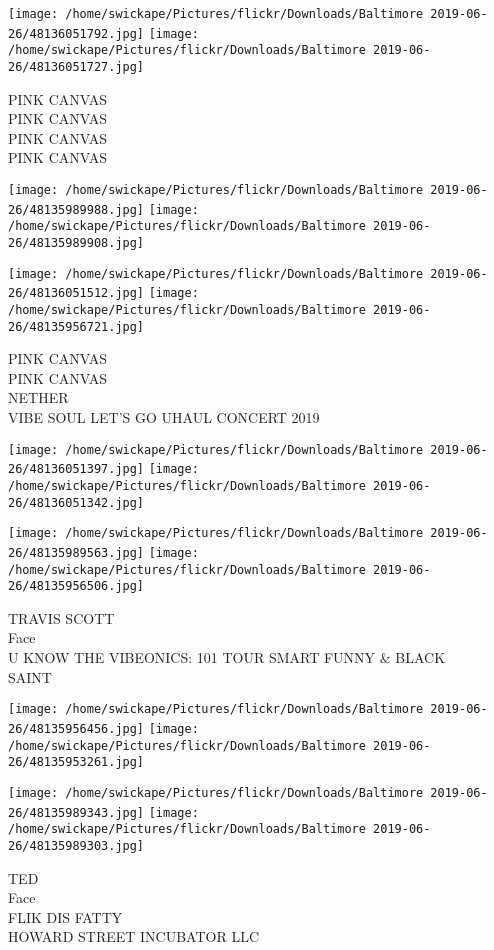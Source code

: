 \documentclass[10pt,letterpaper]{article}
\begin{document}
\texttt{[image: /home/swickape/Pictures/flickr/Downloads/Baltimore 2019-06-26/48136051792.jpg]}
\texttt{[image: /home/swickape/Pictures/flickr/Downloads/Baltimore 2019-06-26/48136051727.jpg]}

PINK CANVAS\\
PINK CANVAS\\
PINK CANVAS\\
PINK CANVAS
\pagebreak

\texttt{[image: /home/swickape/Pictures/flickr/Downloads/Baltimore 2019-06-26/48135989988.jpg]}
\texttt{[image: /home/swickape/Pictures/flickr/Downloads/Baltimore 2019-06-26/48135989908.jpg]}

\texttt{[image: /home/swickape/Pictures/flickr/Downloads/Baltimore 2019-06-26/48136051512.jpg]}
\texttt{[image: /home/swickape/Pictures/flickr/Downloads/Baltimore 2019-06-26/48135956721.jpg]}

PINK CANVAS\\
PINK CANVAS\\
NETHER\\
VIBE SOUL LET'S GO UHAUL CONCERT 2019
\pagebreak

\texttt{[image: /home/swickape/Pictures/flickr/Downloads/Baltimore 2019-06-26/48136051397.jpg]}
\texttt{[image: /home/swickape/Pictures/flickr/Downloads/Baltimore 2019-06-26/48136051342.jpg]}

\texttt{[image: /home/swickape/Pictures/flickr/Downloads/Baltimore 2019-06-26/48135989563.jpg]}
\texttt{[image: /home/swickape/Pictures/flickr/Downloads/Baltimore 2019-06-26/48135956506.jpg]}

TRAVIS SCOTT\\
Face\\
U KNOW THE VIBEONICS: 101 TOUR SMART FUNNY \& BLACK\\
SAINT
\pagebreak

\texttt{[image: /home/swickape/Pictures/flickr/Downloads/Baltimore 2019-06-26/48135956456.jpg]}
\texttt{[image: /home/swickape/Pictures/flickr/Downloads/Baltimore 2019-06-26/48135953261.jpg]}

\texttt{[image: /home/swickape/Pictures/flickr/Downloads/Baltimore 2019-06-26/48135989343.jpg]}
\texttt{[image: /home/swickape/Pictures/flickr/Downloads/Baltimore 2019-06-26/48135989303.jpg]}

TED\\
Face\\
FLIK DIS FATTY\\
HOWARD STREET INCUBATOR LLC
\pagebreak
\end{document}
